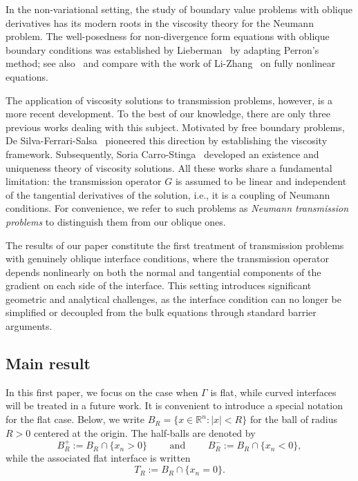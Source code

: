 \documentclass[letter,11pt]{amsart}
\newcommand{\R}{\mathbb{R}}
\theoremstyle{definition}
\numberwithin{equation}{section}
\begin{document}
\medskip

In the non-variational setting, the study of boundary value problems with oblique derivatives has its modern roots in the viscosity theory for the Neumann problem. 
The well-posedness for non-divergence form equations with oblique boundary conditions was established by Lieberman~\cite{LPerron} by adapting Perron's method; see also~\cite{L} and compare with the work of Li-Zhang~\cite{LZ} on fully nonlinear equations.

\medskip

The application of viscosity solutions to transmission problems, however, is a more recent development.
To the best of our knowledge, there are only three previous works dealing with this subject.
Motivated by free boundary problems, De Silva-Ferrari-Salsa~\cite{DFSfb, DFS} pioneered this direction by establishing the viscosity framework.
Subsequently, Soria Carro-Stinga~\cite{SS} developed an existence and uniqueness theory of viscosity solutions.
All these works share a fundamental limitation: the transmission operator $G$ is assumed to be linear and independent of the tangential derivatives of the solution, i.e., it is a coupling of  Neumann conditions.
For convenience, we refer to such problems as \emph{Neumann transmission problems} to distinguish them from our oblique ones.


\medskip

The results of our paper constitute the first treatment of transmission problems with genuinely oblique interface conditions, where the transmission operator depends nonlinearly on both the normal and tangential components of the gradient on each side of the interface.
This setting introduces significant geometric and analytical challenges, as the interface condition can no longer be simplified or decoupled from the bulk equations through standard barrier arguments.

\subsection{Main result}

In this first paper, we focus on the case when $\Gamma$ is flat, while curved interfaces will be treated in a future work.
It is convenient to introduce a special notation for the flat case.
Below, we write $B_R = \{x \in \R^{n} \colon |x| < R\}$ for the ball of radius $R > 0$ centered at the origin.
The half-balls are denoted by
\[
B_{R}^{+} := B_R \cap \{x_n > 0\} \qquad \text{ and } \qquad B_{R}^{-} := B_R \cap \{x_n < 0\},
\]
while the associated flat interface is written
\[
T_{R} := B_R \cap \{x_n = 0\}.
\]
\end{document}
